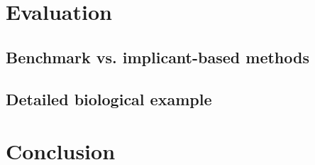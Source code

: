 \documentclass[runningheads]{llncs}
\begin{document}
\section{Evaluation}
\subsection{Benchmark vs. implicant-based methods}
\subsection{Detailed biological example}

\section{Conclusion}




\end{document}
